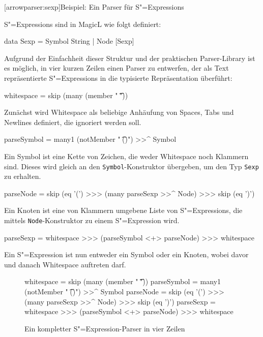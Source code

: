 \documentclass[12pt, a4paper, bibgerm]{scrbook}
\newenvironment{DIFnomarkup}{}{}
\newcommand\icode[1]{\lstinline?#1?}
\newcommand\lsection{}
\newcommand{\sexp}{S"=Expression}
\newcommand{\sexps}{S"=Expressions}
\begin{document}
\lsection[arrowparser:sexp]{Beispiel: Ein Parser für \sexps{}}

\sexps{} sind in MagicL wie folgt definiert:
\begin{DIFnomarkup}\begin{code}
data Sexp = Symbol String
          | Node [Sexp]
\end{code}\end{DIFnomarkup}

Aufgrund der Einfachheit dieser Struktur und der praktischen
Parser-Library ist es möglich, in vier kurzen Zeilen einen Parser zu
entwerfen, der als Text repräsentierte \sexps{} in die typisierte
Repräsentation überführt:

\begin{DIFnomarkup}\begin{code}
whitespace = skip (many (member " \t\n"))
\end{code}\end{DIFnomarkup}
Zunächst wird Whitespace als beliebige Anhäufung von Spaces, Tabs und
Newlines definiert, die ignoriert werden soll.
\begin{DIFnomarkup}\begin{code}
parseSymbol = many1 (notMember " \t\n()") >>^ Symbol
\end{code}\end{DIFnomarkup} %
Ein Symbol ist eine Kette von Zeichen, die weder Whitespace noch
Klammern sind. Dieses wird gleich an den \icode{Symbol}-Konstruktor
übergeben, um den Typ \icode{Sexp} zu erhalten.
\begin{DIFnomarkup}\begin{code}
parseNode = skip (eq '(') >>> (many parseSexp >>^ Node) >>> skip (eq ')')
\end{code}\end{DIFnomarkup} %
Ein Knoten ist eine von Klammern umgebene Liste von \sexps{}, die
mittels \icode{Node}-Konstruktor zu einem \sexp{} wird.
\begin{DIFnomarkup}\begin{code}
parseSexp = whitespace >>> (parseSymbol <+> parseNode) >>> whitespace
\end{code}\end{DIFnomarkup} %
Ein \sexp{} ist nun entweder ein Symbol oder ein Knoten, wobei davor und
danach Whitespace auftreten darf.

\begin{figure}[h]
\begin{DIFnomarkup}\begin{code}
whitespace  = skip (many (member " \t\n"))
parseSymbol = many1 (notMember " \t\n()") >>^ Symbol
parseNode   = skip (eq '(') >>> (many parseSexp >>^ Node) >>> skip (eq ')')
parseSexp   = whitespace >>> (parseSymbol <+> parseNode) >>> whitespace    
  \end{code}\end{DIFnomarkup}
  \caption{Ein kompletter \sexp{}-Parser in vier Zeilen}
  \label{magicl:fig:sexp_parser}
\end{figure}
\end{document}
